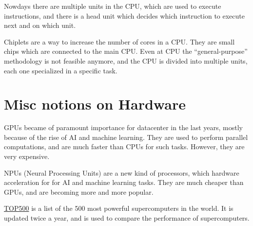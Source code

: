 Nowdays there are multiple units in the CPU, which are used to execute instructions, and there is a head unit which decides which instruction to execute next and on which unit.

Chiplets are a way to increase the number of cores in a CPU. They are small chips which are connected to the main CPU.
Even at CPU the ``general-purpose'' methodology is not feasible anymore, and the CPU is divided into multiple units, each one specialized in a specific task.

\section{Misc notions on Hardware}
GPUs became of paramount importance for datacenter in the last years, mostly because of the rise of AI and machine learning. They are used to perform parallel computations, and are much faster than CPUs for such tasks.
However, they are very expensive.

NPUs (Neural Processing Units) are a new kind of processors, which hardware acceleration for for AI and machine learning tasks.
They are much cheaper than GPUs, and are becoming more and more popular.

\href{https://www.top500.org/}{TOP500} is a list of the 500 most powerful supercomputers in the world. It is updated twice a year, and is used to compare the performance of supercomputers.

